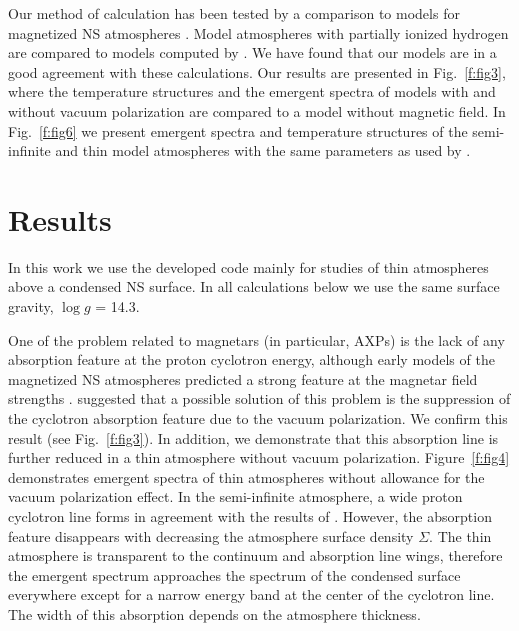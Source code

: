 \documentclass{aa}
\begin{document}
 
Our method of calculation has been tested by a comparison to models for magnetized NS 
atmospheres \citep{Shibanovetal:92, Pavlovetal:94, Ho.Lai:01, Ozel:01, 
Ho.Lai:03}.  Model atmospheres with partially ionized 
hydrogen are compared to models computed by \cite{Hoetal:07}.
We have found that our models are 
in a good agreement with these  calculations. Our results are 
presented in 
Fig.~\ref{f:fig3}, where the temperature structures and the emergent spectra 
of  models with and without vacuum polarization are compared to a 
model without magnetic field. In 
Fig.~\ref{f:fig6} we present 
 emergent spectra and temperature structures of 
the semi-infinite and thin model atmospheres with the same parameters 
as used by \cite{Hoetal:07}. 
 
\section {Results} 
\label{s:results} 
 
In this work we use the developed code 
mainly for studies of thin 
atmospheres above a condensed NS surface. In all calculations below we use 
the same surface gravity, $\log g$ = 14.3. 


One of the problem related to magnetars (in particular, AXPs) 
is the lack of any absorption feature at the 
proton cyclotron energy, 
although early models of the magnetized NS 
atmospheres predicted a strong feature 
at the magnetar field strengths 
\citep{Ho.Lai:01,Zaneetal:01}. \citet{Ho.Lai:03} 
suggested that a possible 
solution of this problem is the 
suppression of the cyclotron absorption feature due to the 
vacuum polarization. We confirm this result (see Fig.~\ref{f:fig3}). 
In addition, we 
demonstrate that this 
absorption line is further reduced in a thin atmosphere
 without vacuum polarization. 
Figure~\ref{f:fig4} demonstrates emergent spectra of 
 thin atmospheres without allowance for 
the vacuum polarization effect. 
In the semi-infinite atmosphere, 
a wide proton cyclotron line 
forms in agreement with the results of \citet{Ho.Lai:01,Zaneetal:01}. 
However, the absorption 
feature disappears with decreasing 
the atmosphere surface density $\Sigma$. 
The thin atmosphere is transparent to the 
continuum and absorption line wings, therefore 
the emergent spectrum approaches the 
spectrum of the condensed surface everywhere except for 
a narrow energy band at the 
center of the cyclotron line. 
The width of this absorption 
depends on the atmosphere thickness. 
 
\end{document}
